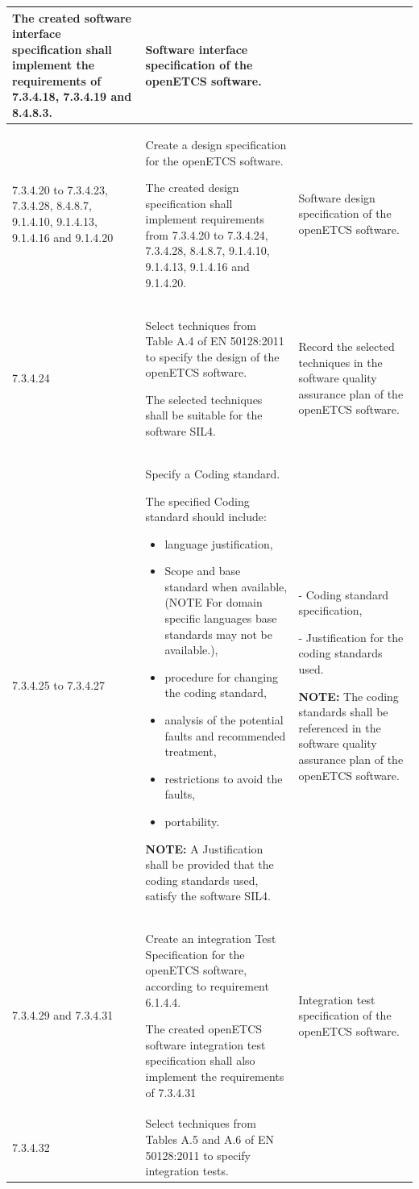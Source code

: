 \documentclass{template/openetcs_report}
\begin{document}
{\begin{longtable}{|p{2cm}|p{9cm}|p{3cm}|}
The created software interface specification shall implement the requirements of 7.3.4.18, 7.3.4.19 and 8.4.8.3.
& Software interface specification of the openETCS software.\\ 
\hline
7.3.4.20 to 7.3.4.23, 7.3.4.28, 8.4.8.7, 9.1.4.10, 9.1.4.13, 9.1.4.16 and 9.1.4.20
& Create a design specification for the openETCS software.

The created design specification shall implement requirements from 7.3.4.20 to 7.3.4.24, 7.3.4.28, 8.4.8.7, 9.1.4.10, 9.1.4.13, 9.1.4.16 and 9.1.4.20.
& Software design specification of the openETCS software.\\ 
\hline
7.3.4.24 & Select techniques from Table A.4 of EN 50128:2011 to specify the design of the openETCS software.

The selected techniques shall be suitable for the software SIL4.
& Record the selected techniques in the software quality assurance plan of the openETCS software.\\ 
\hline
7.3.4.25 to 7.3.4.27 & 
Specify a Coding standard.

The specified Coding standard should include:
\begin{itemize}\itemsep=0pt
  \item language justification,
  \item Scope and base standard when available, (NOTE For domain specific languages base standards may not be available.),
  \item procedure for changing the coding standard,
  \item analysis of the potential faults and recommended treatment,
  \item restrictions to avoid the faults,
  \item portability.
\end{itemize}
\textbf{NOTE:} \linebreak
A Justification shall be provided that the coding standards used, satisfy the software SIL4.
& 
- Coding standard specification,

- Justification for the coding standards used.

\textbf{NOTE:} \linebreak
The coding standards shall be referenced in the software quality assurance plan of the openETCS software.\\ 
\hline
7.3.4.29 and 7.3.4.31 & Create an integration Test Specification for the openETCS software, according to requirement 6.1.4.4.

The created openETCS software integration test specification shall also implement the requirements of 7.3.4.31
& Integration test specification of the openETCS software.\\ 
\hline
7.3.4.32 & Select techniques from Tables A.5 and A.6 of EN 50128:2011 to specify integration tests.


\end{longtable}}
\end{document}
